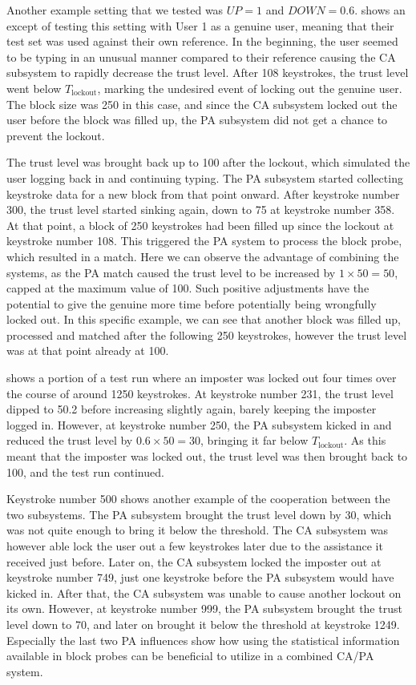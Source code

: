 Another example setting that we tested was $\textit{UP}=1$ and $\textit{DOWN}=0.6$.
 shows an except of testing this setting with User 1 as a genuine user, meaning that their test set was used against their own reference.
In the beginning, the user seemed to be typing in an unusual manner compared to their reference causing the CA subsystem to rapidly decrease the trust level.
After 108 keystrokes, the trust level went below $T_{\text{lockout}}$, marking the undesired event of locking out the genuine user.
The block size was 250 in this case, and since the CA subsystem locked out the user before the block was filled up, the PA subsystem did not get a chance to prevent the lockout.

The trust level was brought back up to 100 after the lockout, which simulated the user logging back in and continuing typing.
The PA subsystem started collecting keystroke data for a new block from that point onward.
After keystroke number 300, the trust level started sinking again, down to 75 at keystroke number 358.
At that point, a block of 250 keystrokes had been filled up since the lockout at keystroke number 108.
This triggered the PA system to process the block probe, which resulted in a match.
Here we can observe the advantage of combining the systems, as the PA match caused the trust level to be increased by $1 \times 50 = 50$, capped at the maximum value of 100.
Such positive adjustments have the potential to give the genuine more time before potentially being wrongfully locked out.
In this specific example, we can see that another block was filled up, processed and matched after the following 250 keystrokes, however the trust level was at that point already at 100.

 shows a portion of a test run where an imposter was locked out four times over the course of around 1250 keystrokes.
At keystroke number 231, the trust level dipped to 50.2 before increasing slightly again, barely keeping the imposter logged in.
However, at keystroke number 250, the PA subsystem kicked in and reduced the trust level by $0.6 \times 50 = 30$, bringing it far below $T_{\text{lockout}}$.
As this meant that the imposter was locked out, the trust level was then brought back to 100, and the test run continued.

Keystroke number 500 shows another example of the cooperation between the two subsystems.
The PA subsystem brought the trust level down by 30, which was not quite enough to bring it below the threshold.
The CA subsystem was however able lock the user out a few keystrokes later due to the assistance it received just before.
Later on, the CA subsystem locked the imposter out at keystroke number 749, just one keystroke before the PA subsystem would have kicked in.
After that, the CA subsystem was unable to cause another lockout on its own.
However, at keystroke number 999, the PA subsystem brought the trust level down to 70, and later on brought it below the threshold at keystroke 1249.
Especially the last two PA influences show how using the statistical information available in block probes can be beneficial to utilize in a combined CA/PA system.


